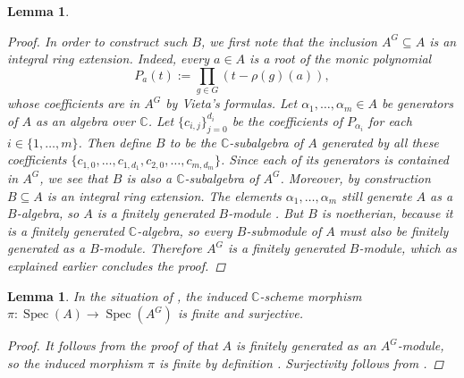 \documentclass[12pt,a4paper]{amsart}
\theoremstyle{plain}
\newtheorem{lm}[thm]{Lemma}
\theoremstyle{definition}
\theoremstyle{remark}
\begin{document}
\begin{lm}
\begin{proof}
    In order to construct such $B$, we first note that the inclusion $A^{G} \subseteq A$ is an integral ring extension.
    Indeed, every $a \in A$ is a root of the monic polynomial
    \[ P_{a}(t) := \prod_{g \in G}(t - \rho(g)(a)), \]
    whose coefficients are in $A^{G}$ by Vieta's formulas.
    Let $\alpha_{1}, \ldots, \alpha_{m} \in A$ be generators of $A$ as an algebra over $\mathbb{C}$.
    Let $\{ c_{i,j} \}_{j = 0}^{d_{i}}$ be the coefficients of $P_{\alpha_{i}}$ for each $i \in \{1, \ldots, m\}$.
    Then define $B$ to be the $\mathbb{C}$-subalgebra of $A$ generated by all these coefficients $\{ c_{1,0}, \ldots, c_{1,d_{1}}, c_{2,0}, \ldots, c_{m,d_{m}} \}$.
    Since each of its generators is contained in $A^{G}$, we see that $B$ is also a $\mathbb{C}$-subalgebra of $A^{G}$.
    Moreover, by construction $B \subseteq A$ is an integral ring extension.
    The elements $\alpha_{1}, \ldots, \alpha_{m}$ still generate $A$ as a $B$-algebra, so $A$ is a finitely generated $B$-module \cite[Corollary 5.2]{am69}.
    But $B$ is noetherian, because it is a finitely generated $\mathbb{C}$-algebra, so every $B$-submodule of $A$ must also be finitely generated as a $B$-module.
    Therefore $A^{G}$ is a finitely generated $B$-module, which as explained earlier concludes the proof.
  \end{proof}

\end{lm}

\begin{lm}\label{lm:finitesurjective}
  In the situation of , the induced $\mathbb{C}$-scheme morphism $\pi \colon \operatorname{Spec}(A) \to \operatorname{Spec}(A^{G})$ is finite and surjective.

  \begin{proof}
    It follows from the proof of  that $A$ is finitely generated as an $A^{G}$-module, so the induced morphism $\pi$ is finite by definition \cite[p.~84]{har77}.
    Surjectivity follows from \cite[\href{https://stacks.math.columbia.edu/tag/00GQ}{Tag 00GQ}]{stacks-project}.
  \end{proof}
\end{lm}
\end{document}
